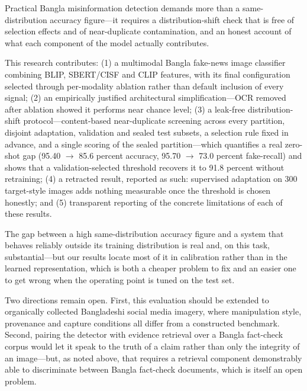 \documentclass[conference,a4paper]{IEEEtran}
\newif\ifblindsubmission
\begin{document}
Practical Bangla misinformation detection demands more than a
same-distribution accuracy figure---it requires a distribution-shift check
that is free of selection effects and of near-duplicate contamination, and an
honest account of what each component of the model actually contributes.

This research contributes: (1) a multimodal Bangla fake-news image classifier
combining BLIP, SBERT/CISF and CLIP features, with its final configuration
selected through per-modality ablation rather than default inclusion of every
signal; (2) an empirically justified architectural simplification---OCR
removed after ablation showed it performs near chance level; (3) a leak-free
distribution-shift protocol---content-based near-duplicate screening across
every partition, disjoint adaptation, validation and sealed test subsets, a
selection rule fixed in advance, and a single scoring of the sealed
partition---which quantifies a real zero-shot gap (95.40 $\rightarrow$
85.6 percent accuracy, 95.70 $\rightarrow$ 73.0 percent fake-recall) and shows
that a validation-selected threshold recovers it to 91.8 percent without
retraining; (4) a retracted result, reported as such: supervised adaptation on
300 target-style images adds nothing measurable once the threshold is chosen
honestly; and (5) transparent reporting of the concrete limitations of each
of these results.

The gap between a high same-distribution accuracy figure and a system that
behaves reliably outside its training distribution is real and, on this task,
substantial---but our results locate most of it in calibration rather than in
the learned representation, which is both a cheaper problem to fix and an
easier one to get wrong when the operating point is tuned on the test set.

Two directions remain open. First, this evaluation should be extended to
organically collected Bangladeshi social media imagery, where manipulation
style, provenance and capture conditions all differ from a constructed
benchmark. Second, pairing the detector with evidence retrieval over a Bangla
fact-check corpus would let it speak to the truth of a claim rather than only
the integrity of an image---but, as noted above, that requires a retrieval
component demonstrably able to discriminate between Bangla fact-check
documents, which is itself an open problem.

\ifblindsubmission\else
\end{document}
